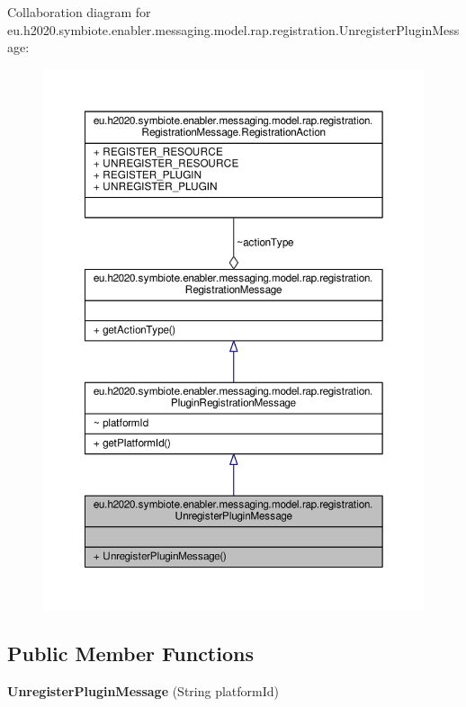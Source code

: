 Collaboration diagram for eu.\+h2020.\+symbiote.\+enabler.\+messaging.\+model.\+rap.\+registration.\+Unregister\+Plugin\+Message\+:
\nopagebreak
\begin{figure}[H]
\begin{center}
\leavevmode
\includegraphics[width=350pt]{classeu_1_1h2020_1_1symbiote_1_1enabler_1_1messaging_1_1model_1_1rap_1_1registration_1_1UnregisterPluginMessage__coll__graph}
\end{center}
\end{figure}
\subsection*{Public Member Functions}
\begin{DoxyCompactItemize}
\item 
\mbox{\label{classeu_1_1h2020_1_1symbiote_1_1enabler_1_1messaging_1_1model_1_1rap_1_1registration_1_1UnregisterPluginMessage_a8ec3d0f5e5ac1788c47963ec102b0f2f}} 
{\bfseries Unregister\+Plugin\+Message} (String platform\+Id)
\end{DoxyCompactItemize}


